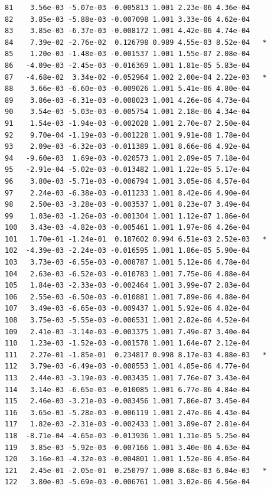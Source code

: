 \documentclass[
  letterpaper,
  DIV=11,
  numbers=noendperiod]{scrartcl}
\begin{document}
\begin{verbatim}
81    3.56e-03 -5.07e-03 -0.005813 1.001 2.23e-06 4.36e-04    
82    3.85e-03 -5.88e-03 -0.007098 1.001 3.33e-06 4.62e-04    
83    3.85e-03 -6.37e-03 -0.008172 1.001 4.42e-06 4.74e-04    
84    7.39e-02 -2.76e-02  0.126798 0.989 4.55e-03 8.52e-04   *
85    1.20e-03 -1.48e-03 -0.001537 1.001 1.55e-07 2.08e-04    
86   -4.09e-03 -2.45e-03 -0.016369 1.001 1.81e-05 5.83e-04    
87   -4.68e-02  3.34e-02 -0.052964 1.002 2.00e-04 2.22e-03   *
88    3.66e-03 -6.60e-03 -0.009026 1.001 5.41e-06 4.80e-04    
89    3.86e-03 -6.31e-03 -0.008023 1.001 4.26e-06 4.73e-04    
90    3.54e-03 -5.03e-03 -0.005754 1.001 2.18e-06 4.34e-04    
91    1.54e-03 -1.94e-03 -0.002028 1.001 2.70e-07 2.50e-04    
92    9.70e-04 -1.19e-03 -0.001228 1.001 9.91e-08 1.78e-04    
93    2.09e-03 -6.32e-03 -0.011389 1.001 8.66e-06 4.92e-04    
94   -9.60e-03  1.69e-03 -0.020573 1.001 2.89e-05 7.18e-04    
95   -2.91e-04 -5.02e-03 -0.013482 1.001 1.22e-05 5.17e-04    
96    3.80e-03 -5.71e-03 -0.006794 1.001 3.05e-06 4.57e-04    
97    2.24e-03 -6.38e-03 -0.011233 1.001 8.42e-06 4.90e-04    
98    2.50e-03 -3.28e-03 -0.003537 1.001 8.23e-07 3.49e-04    
99    1.03e-03 -1.26e-03 -0.001304 1.001 1.12e-07 1.86e-04    
100   3.43e-03 -4.82e-03 -0.005461 1.001 1.97e-06 4.26e-04    
101   1.70e-01 -1.24e-01  0.187602 0.994 6.51e-03 2.52e-03   *
102  -4.39e-03 -2.24e-03 -0.016595 1.001 1.86e-05 5.90e-04    
103   3.73e-03 -6.55e-03 -0.008787 1.001 5.12e-06 4.78e-04    
104   2.63e-03 -6.52e-03 -0.010783 1.001 7.75e-06 4.88e-04    
105   1.84e-03 -2.33e-03 -0.002464 1.001 3.99e-07 2.83e-04    
106   2.55e-03 -6.50e-03 -0.010881 1.001 7.89e-06 4.88e-04    
107   3.49e-03 -6.65e-03 -0.009437 1.001 5.92e-06 4.82e-04    
108   3.75e-03 -5.55e-03 -0.006531 1.001 2.82e-06 4.52e-04    
109   2.41e-03 -3.14e-03 -0.003375 1.001 7.49e-07 3.40e-04    
110   1.23e-03 -1.52e-03 -0.001578 1.001 1.64e-07 2.12e-04    
111   2.27e-01 -1.85e-01  0.234817 0.998 8.17e-03 4.88e-03   *
112   3.79e-03 -6.49e-03 -0.008553 1.001 4.85e-06 4.77e-04    
113   2.44e-03 -3.19e-03 -0.003435 1.001 7.76e-07 3.43e-04    
114   3.14e-03 -6.65e-03 -0.010085 1.001 6.77e-06 4.84e-04    
115   2.46e-03 -3.21e-03 -0.003456 1.001 7.86e-07 3.45e-04    
116   3.65e-03 -5.28e-03 -0.006119 1.001 2.47e-06 4.43e-04    
117   1.82e-03 -2.31e-03 -0.002433 1.001 3.89e-07 2.81e-04    
118  -8.71e-04 -4.65e-03 -0.013936 1.001 1.31e-05 5.25e-04    
119   3.85e-03 -5.92e-03 -0.007166 1.001 3.40e-06 4.63e-04    
120   3.16e-03 -4.32e-03 -0.004801 1.001 1.52e-06 4.05e-04    
121   2.45e-01 -2.05e-01  0.250797 1.000 8.68e-03 6.04e-03   *
122   3.80e-03 -5.69e-03 -0.006761 1.001 3.02e-06 4.56e-04    

\end{verbatim}
\end{document}
